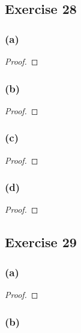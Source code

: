 \documentclass[14pt]{extarticle}
\begin{document}
\subsection{Exercise 28}

\subsubsection{(a)}

\begin{proof}

\end{proof}

\subsubsection{(b)}

\begin{proof}

\end{proof}

\subsubsection{(c)}

\begin{proof}

\end{proof}

\subsubsection{(d)}

\begin{proof}

\end{proof}

\subsection{Exercise 29}

\subsubsection{(a)}

\begin{proof}

\end{proof}

\subsubsection{(b)}
\end{document}
